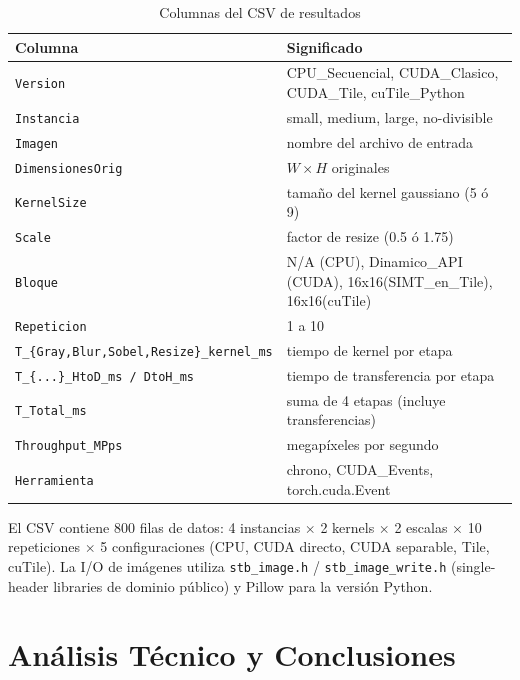 \documentclass[12pt,a4paper]{article}
\begin{document}
\begin{table}[H]
\centering
\caption{Columnas del CSV de resultados}
\small
\begin{tabular}{lp{}}
\toprule
\textbf{Columna} & \textbf{Significado} \\
\midrule
\texttt{Version} & CPU\_Secuencial, CUDA\_Clasico, CUDA\_Tile, cuTile\_Python \\
\texttt{Instancia} & small, medium, large, no-divisible \\
\texttt{Imagen} & nombre del archivo de entrada \\
\texttt{DimensionesOrig} & $W \times H$ originales \\
\texttt{KernelSize} & tama\~no del kernel gaussiano (5 \'o 9) \\
\texttt{Scale} & factor de resize (0.5 \'o 1.75) \\
\texttt{Bloque} & N/A (CPU), Dinamico\_API (CUDA), 16x16(SIMT\_en\_Tile), 16x16(cuTile) \\
\texttt{Repeticion} & 1 a 10 \\
\texttt{T\_\{Gray,Blur,Sobel,Resize\}\_kernel\_ms} & tiempo de kernel por etapa \\
\texttt{T\_\{...\}\_HtoD\_ms / DtoH\_ms} & tiempo de transferencia por etapa \\
\texttt{T\_Total\_ms} & suma de 4 etapas (incluye transferencias) \\
\texttt{Throughput\_MPps} & megap\'ixeles por segundo \\
\texttt{Herramienta} & chrono, CUDA\_Events, torch.cuda.Event \\
\bottomrule
\end{tabular}
\end{table}

El CSV contiene 800 filas de datos: 4 instancias $\times$ 2 kernels $\times$ 2 escalas $\times$ 10 repeticiones $\times$ 5 configuraciones (CPU, CUDA directo, CUDA separable, Tile, cuTile). La I/O de im\'agenes utiliza \texttt{stb\_image.h} / \texttt{stb\_image\_write.h} (single-header libraries de dominio p\'ublico) y Pillow para la versi\'on Python.

\section{An\'alisis T\'ecnico y Conclusiones}
\end{document}
